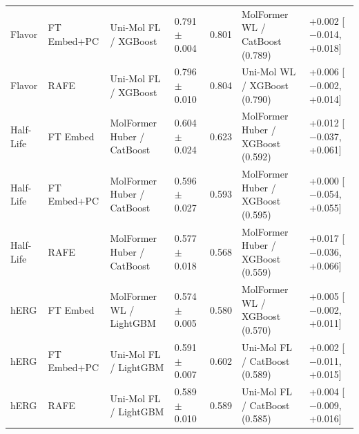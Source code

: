 \begin{tabular}{lllllll}
Flavor & FT Embed+PC & Uni-Mol FL / XGBoost & 0.791 $\pm$ 0.004 & 0.801 & MolFormer WL / CatBoost (0.789) & +0.002 [$-$0.014, +0.018] \\
Flavor & RAFE & Uni-Mol FL / XGBoost & 0.796 $\pm$ 0.010 & 0.804 & Uni-Mol WL / XGBoost (0.790) & +0.006 [$-$0.002, +0.014] \\
Half-Life & FT Embed & MolFormer Huber / CatBoost & 0.604 $\pm$ 0.024 & 0.623 & MolFormer Huber / XGBoost (0.592) & +0.012 [$-$0.037, +0.061] \\
Half-Life & FT Embed+PC & MolFormer Huber / CatBoost & 0.596 $\pm$ 0.027 & 0.593 & MolFormer Huber / XGBoost (0.595) & +0.000 [$-$0.054, +0.055] \\
Half-Life & RAFE & MolFormer Huber / CatBoost & 0.577 $\pm$ 0.018 & 0.568 & MolFormer Huber / XGBoost (0.559) & +0.017 [$-$0.036, +0.066] \\
hERG & FT Embed & MolFormer WL / LightGBM & 0.574 $\pm$ 0.005 & 0.580 & MolFormer WL / XGBoost (0.570) & +0.005 [$-$0.002, +0.011] \\
hERG & FT Embed+PC & Uni-Mol FL / LightGBM & 0.591 $\pm$ 0.007 & 0.602 & Uni-Mol FL / CatBoost (0.589) & +0.002 [$-$0.011, +0.015] \\
hERG & RAFE & Uni-Mol FL / LightGBM & 0.589 $\pm$ 0.010 & 0.589 & Uni-Mol FL / CatBoost (0.585) & +0.004 [$-$0.009, +0.016] \\
\bottomrule
\end{tabular}
